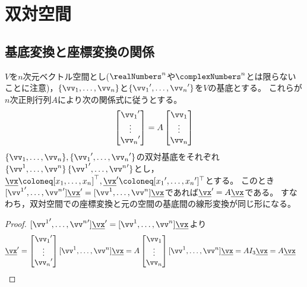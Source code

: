\chapter{双対空間}
    \section{基底変換と座標変換の関係}
        \begin{shadebox}
            $V$を$n$次元ベクトル空間とし($\realNumbers^n$や$\complexNumbers^n$とは限らないことに注意)，$\{\vv_1,\dotsc,\vv_n\}$と$\{{\vv_1}',\dotsc,{\vv_n}'\}$を$V$の基底とする。
            これらが$n$次正則行列$A$により次の関係式に従うとする。
            \[
                \begin{bmatrix}
                    {\vv_1}' \\
                    \vdots \\
                    {\vv_n}'
                \end{bmatrix}
                = A
                \begin{bmatrix}
                    \vv_1 \\
                    \vdots \\
                    \vv_n
                \end{bmatrix}
            \]
            $\{\vv_1,\dotsc,\vv_n\},\{{\vv_1}',\dotsc,{\vv_n}'\}$の双対基底をそれぞれ$\{\vv^1,\dotsc,\vv^n\}\,\{{\vv^1}',\dotsc,{\vv^n}'\}$とし，
            $\underline{\vx} \coloneq [x_1,\dotsc,x_n]^\top,\underline{\vx}' \coloneq [{x_1}',\dotsc,{x_n}']^\top$とする。
            このとき$[{\vv^1}',\dotsc,{\vv^n}']\underline{\vx}' = [\vv^1,\dotsc,\vv^n]\underline{\vx}$であれば$\underline{\vx}' = A\underline{\vx}$である。
            すなわち，双対空間での座標変換と元の空間の基底間の線形変換が同じ形になる。
        \end{shadebox}
        \begin{proof}
            $[{\vv^1}',\dotsc,{\vv^n}']\underline{\vx}' = [\vv^1,\dotsc,\vv^n]\underline{\vx}$より
            \begin{align*}
                \underline{\vx}' &= 
                \begin{bmatrix}
                    {\vv_1}' \\
                    \vdots \\
                    {\vv_n}'
                \end{bmatrix}
                [\vv^1,\dotsc,\vv^n]\underline{\vx} = A
                \begin{bmatrix}
                    \vv_1 \\
                    \vdots \\
                    \vv_n
                \end{bmatrix}
                [\vv^1,\dotsc,\vv^n]\underline{\vx} = A I_3\underline{\vx} = A\underline{\vx}
            \end{align*}
        \end{proof}